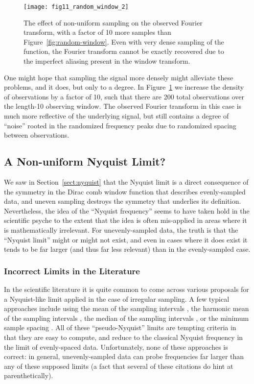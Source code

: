 \documentclass[preprint]{aastex}
\newcommand{\Fig}[1]{Figure~\ref{fig:#1}}
\newcommand{\fig}[1]{Figure~\ref{fig:#1}}
\newcommand{\figlabel}[1]{\label{fig:#1}}
\newcommand{\Sect}[1]{Section~\ref{sect:#1}}
\newcommand{\sect}[1]{\Sect{#1}}
\newcommand{\sectlabel}[1]{\label{sect:#1}}
\begin{document}
\begin{figure}[ht]
  \centering
  \texttt{[image: fig11\_random\_window\_2]}
  \caption{The effect of non-uniform sampling on the observed Fourier transform,
    with a factor of 10 more samples than \fig{random-window}.
    Even with very dense sampling of the function, the Fourier transform
    cannot be exactly recovered due to the imperfect aliasing present in
    the window transform.
    \figlabel{random-window-2}}
\end{figure}

One might hope that sampling the signal more densely might alleviate
these problems, and it does, but only to a degree.
In \Fig{random-window-2} we increase the density of observations by a factor of 10,
such that there are 200 total observations over the length-10 observing window.
The observed Fourier transform in this case is much more reflective of the
underlying signal, but still contains a degree of ``noise'' rooted in the
randomized frequency peaks due to randomized spacing between observations.

\subsection{A Non-uniform Nyquist Limit?}
\sectlabel{pseudo-nyquist}

We saw in \sect{nyquist} that the Nyquist limit is a direct consequence
of the symmetry in the Dirac comb window function that describes evenly-sampled data,
and uneven sampling destroys the symmetry that underlies its definition.
Nevertheless, the idea of the ``Nyquist frequency'' seems to have taken hold
in the scientific psyche to the extent that the idea is often mis-applied in
areas where it is mathematically irrelevant.
For unevenly-sampled data, the truth is that the ``Nyquist limit'' might or
might not exist, and even in cases where it does exist it tends to be far
larger (and thus far less relevant) than in the evenly-sampled case.

\subsubsection{Incorrect Limits in the Literature}

In the scientific literature it is quite common to come across various proposals
for a Nyquist-like limit applied in the case of irregular sampling.
A few typical approaches include using the mean of the sampling intervals
\citep[e.g.][]{Scargle82, Horne86, NumRec},
the harmonic mean of the sampling intervals \citep[e.g.][]{Debosscher07},
the median of the sampling intervals \citep[e.g.][]{Graham2013b},
or the minimum sample spacing \citep[e.g.][]{Percy86, Roberts87, Press89, Hilditch01}.
All of these ``pseudo-Nyquist'' limits are tempting criteria in that
they are easy to compute, and reduce to the classical Nyquist
frequency in the limit of evenly-spaced data.
Unfortunately, none of these approaches is correct: in general,
unevenly-sampled data can probe frequencies far larger than any of these
supposed limits (a fact that several of these citations do hint at
parenthetically).
\end{document}
